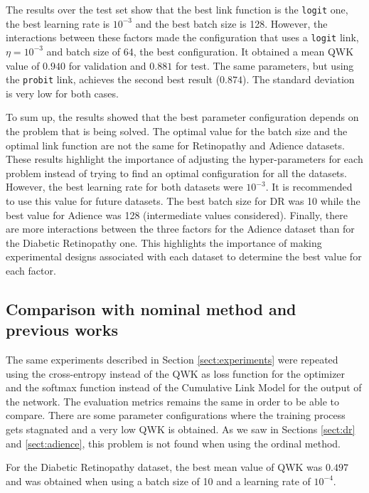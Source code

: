 \documentclass[journal]{IEEEtran}
\begin{document}
	The results over the test set show that the best link function is the \texttt{logit} one, the best learning rate is $10^{-3}$ and the best batch size is 128. However, the interactions between these factors made the configuration that uses a \texttt{logit} link, $\eta=10^{-3}$ and batch size of 64, the best configuration. It obtained a mean QWK value of $0.940$ for validation and $0.881$ for test. The same parameters, but using the \texttt{probit} link, achieves the second best result ($0.874$). The standard deviation is very low for both cases.
	
	To sum up, the results showed that the best parameter configuration depends on the problem that is being solved. The optimal value for the batch size and the optimal link function are not the same for Retinopathy and Adience datasets. These results highlight the importance of adjusting the hyper-parameters for each problem instead of trying to find an optimal configuration for all the datasets. However, the best learning rate for both datasets were $10^{-3}$. It is recommended to use this value for future datasets.
	The best batch size for DR was 10 while the best value for Adience was 128 (intermediate values considered).
	Finally, there are more interactions between the three factors for the Adience dataset than for the Diabetic Retinopathy one. This highlights the importance of making experimental designs associated with each dataset to determine the best value for each factor.
	
	\subsection{Comparison with nominal method and previous works}
	\label{sect:NominalComparison}
	
	The same experiments described in Section \ref{sect:experiments} were repeated using the cross-entropy instead of the QWK as loss function for the optimizer and the softmax function instead of the Cumulative Link Model for the output of the network. The evaluation metrics remains the same in order to be able to compare. There are some parameter configurations where the training process gets stagnated and a very low QWK is obtained. As we saw in Sections \ref{sect:dr} and \ref{sect:adience}, this problem is not found when using the ordinal method.
	
	For the Diabetic Retinopathy dataset, the best mean value of QWK was $0.497$ and was obtained when using a batch size of 10 and a learning rate of $10^{-4}$.
	
\end{document}
